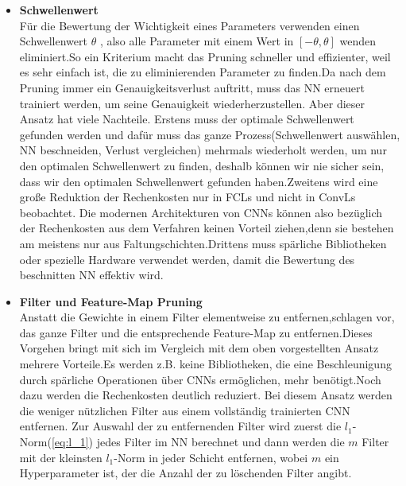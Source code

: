 \documentclass[12pt,a4paper]{scrartcl}
\numberwithin{equation}{section}
\begin{document}
\begin{itemize}
		\item \textbf{Schwellenwert}\label{Schwellenwert}\\
			Für die Bewertung der Wichtigkeit eines Parameters verwenden \cite[Han et al]{pruning} einen Schwellenwert $ \theta $ , also alle Parameter mit einem Wert in $ [-\theta, \theta] $ wenden eliminiert.So ein Kriterium macht das Pruning schneller und effizienter, weil es sehr einfach ist, die zu eliminierenden Parameter zu finden.Da nach dem Pruning immer ein Genauigkeitsverlust auftritt, muss das \ac{NN} erneuert trainiert werden, um seine Genauigkeit wiederherzustellen. Aber dieser Ansatz hat viele Nachteile. Erstens muss der optimale Schwellenwert gefunden werden und dafür muss das ganze Prozess(Schwellenwert auswählen, \ac{NN} beschneiden, Verlust vergleichen) mehrmals wiederholt werden, um nur den optimalen Schwellenwert zu finden, deshalb können wir nie sicher sein, dass wir den optimalen Schwellenwert gefunden haben.Zweitens wird eine  große Reduktion der Rechenkosten nur in \acsp{FCL} und nicht in \acsp{ConvL} beobachtet\cite{Filter Pruning}. Die modernen Architekturen von \acsp{CNN} können also bezüglich der Rechenkosten aus dem Verfahren keinen Vorteil ziehen,denn sie bestehen am meistens nur aus Faltungschichten.Drittens muss spärliche Bibliotheken oder spezielle Hardware verwendet werden, damit die Bewertung des beschnitten \ac{NN} effektiv wird.
	
	\item \textbf{Filter und Feature-Map Pruning}\\
		Anstatt die Gewichte in einem Filter elementweise zu entfernen,schlagen \cite[Li et al]{Filter Pruning} vor, das ganze Filter und die entsprechende Feature-Map zu entfernen.Dieses Vorgehen bringt mit sich im Vergleich mit dem oben vorgestellten Ansatz mehrere Vorteile.Es werden z.B. keine Bibliotheken, die eine Beschleunigung durch spärliche Operationen über \acsp{CNN} ermöglichen, mehr benötigt.Noch dazu werden die Rechenkosten deutlich reduziert. Bei diesem Ansatz werden die weniger nützlichen Filter aus einem vollständig trainierten \ac{CNN}  entfernen. Zur Auswahl der zu entfernenden Filter wird zuerst die $ l_1$-Norm(\ref{eq:l_1}) jedes Filter im \ac{NN} berechnet und dann werden die $ m $ Filter mit der kleinsten $ l_1 $-Norm in jeder Schicht entfernen, wobei $ m $ ein Hyperparameter ist, der die Anzahl der zu löschenden Filter angibt.
		

\end{itemize}
\end{document}

